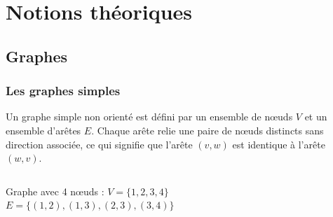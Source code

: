 \documentclass{beamer}
\begin{document}
\section{Notions théoriques}

\subsection{Graphes}
\begin{frame}
\frametitle{Les graphes simples}
\begin{definition}
  Un graphe simple non orienté est défini par un ensemble de nœuds \(V\) et un ensemble d'arêtes \(E\). Chaque arête relie une paire de nœuds distincts sans direction associée, ce qui signifie que l'arête \((v, w)\) est identique à l'arête \((w, v)\).
\end{definition}
\begin{example}
  \begin{columns}
    Graphe avec 4 nœuds :\vspace*{0.4cm}
    \(V = \{1,2,3,4\}\)\\
    $E = \{(1,2), (1, 3), (2,3), (3,4)\}$
    \begin{figure}
      \centering
    \end{figure}
  \end{columns}
\end{example}
\end{frame}
\end{document}
